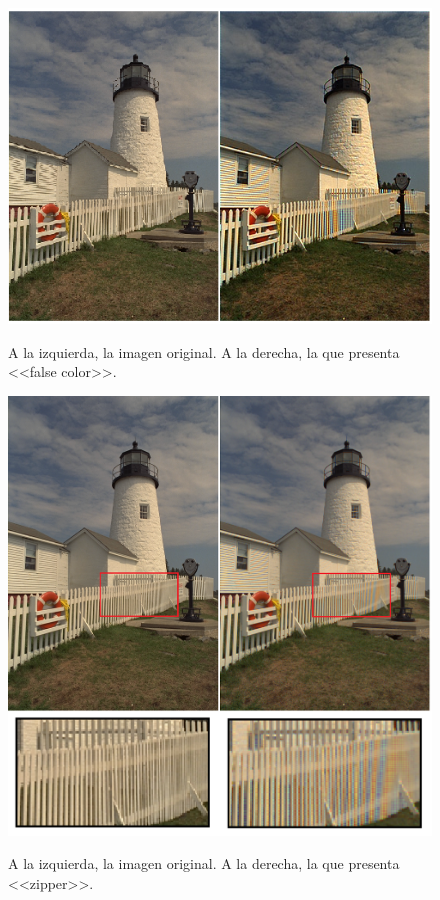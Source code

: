 \documentclass[a4paper]{article}
\begin{document}
\begin{figure}[h!]
	\caption{A la izquierda, la imagen original. A la derecha, la que presenta <<false color>>.}
	\begin{center}
	\includegraphics[scale=0.66]{imagenes/false}
	\label{false}
  \end{center}
\end{figure}

\newpage

\begin{figure}[h!]
	\caption{A la izquierda, la imagen original. A la derecha, la que presenta <<zipper>>.}
	\begin{center}
	\includegraphics[scale=0.50]{imagenes/zipper}
	\label{zipper}
  \end{center}
\end{figure}
\end{document}
